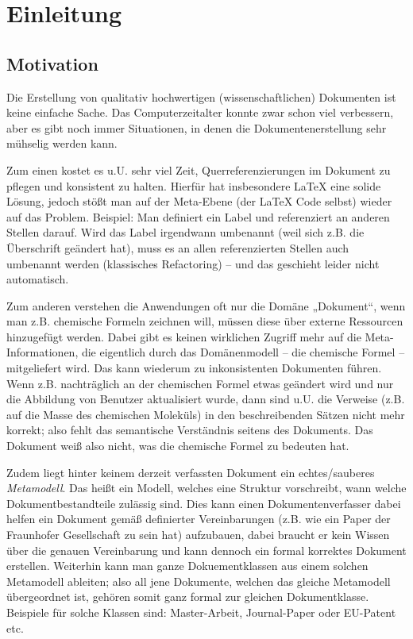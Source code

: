 \chapter{Einleitung}

\section{Motivation}

Die Erstellung von qualitativ hochwertigen (wissenschaftlichen) Dokumenten ist keine einfache Sache.
Das Computerzeitalter konnte zwar schon viel verbessern, aber es gibt noch
immer Situationen, in denen die Dokumentenerstellung sehr mühselig werden kann.

Zum einen kostet es u.U. sehr viel Zeit, Querreferenzierungen im Dokument zu
pflegen und konsistent zu halten.
Hierfür hat insbesondere LaTeX eine solide Lösung, jedoch stößt man auf der Meta-Ebene
(der LaTeX Code selbst) wieder auf das Problem. Beispiel: Man definiert ein
Label und referenziert an anderen Stellen darauf. Wird das Label irgendwann umbenannt
(weil sich z.B. die Überschrift geändert hat), muss es an allen referenzierten
Stellen auch umbenannt werden (klassisches Refactoring) -- und das geschieht
leider nicht automatisch.

Zum anderen verstehen die Anwendungen oft nur die Domäne „Dokument“,
wenn man z.B. chemische Formeln zeichnen will, müssen diese über externe
Ressourcen hinzugefügt werden. Dabei gibt es keinen wirklichen Zugriff
mehr auf die Meta-Informationen, die eigentlich durch das Domänenmodell
-- die chemische Formel -- mitgeliefert wird. Das kann wiederum zu inkonsistenten
Dokumenten führen. Wenn z.B. nachträglich an der chemischen Formel etwas
geändert wird und nur die Abbildung von Benutzer aktualisiert wurde,
dann sind u.U. die Verweise
(z.B. auf die Masse des chemischen Moleküls)
in den beschreibenden Sätzen nicht mehr korrekt;
also fehlt das semantische Verständnis seitens des Dokuments.
Das Dokument weiß also nicht, was die chemische Formel zu bedeuten hat.

Zudem liegt hinter keinem derzeit verfassten Dokument ein echtes/sauberes \emph{Metamodell}.
Das heißt ein Modell, welches eine Struktur vorschreibt, wann welche Dokumentbestandteile
zulässig sind.
Dies kann einen Dokumentenverfasser dabei helfen ein Dokument gemäß definierter
Vereinbarungen (z.B. wie ein Paper der Fraunhofer Gesellschaft zu sein hat) aufzubauen,
dabei braucht er kein Wissen über die genauen Vereinbarung und kann
dennoch ein formal korrektes Dokument erstellen.
Weiterhin kann man ganze Dokuementklassen aus einem solchen Metamodell ableiten;
also all jene Dokumente, welchen das gleiche
Metamodell übergeordnet ist, gehören somit ganz formal zur gleichen Dokumentklasse.
Beispiele für solche Klassen sind: Master-Arbeit, Journal-Paper oder EU-Patent etc.

